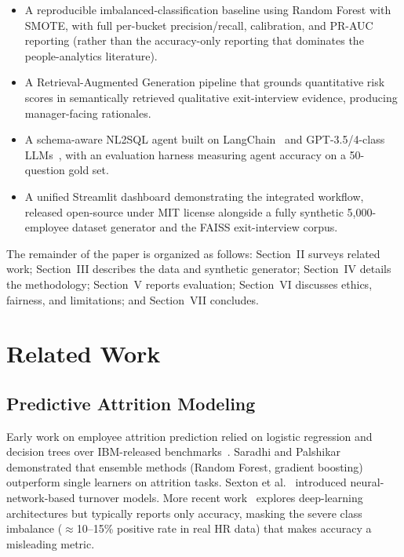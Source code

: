 \documentclass[conference]{IEEEtran}
\begin{document}
\begin{itemize}
\item A reproducible imbalanced-classification baseline using Random
Forest with SMOTE, with full per-bucket precision/recall, calibration,
and PR-AUC reporting (rather than the accuracy-only reporting that
dominates the people-analytics literature).
\item A Retrieval-Augmented Generation pipeline that grounds
quantitative risk scores in semantically retrieved qualitative
exit-interview evidence, producing manager-facing rationales.
\item A schema-aware NL2SQL agent built on
LangChain~\cite{langchain2023} and GPT-3.5/4-class
LLMs~\cite{brown2020}, with an evaluation harness measuring agent
accuracy on a 50-question gold set.
\item A unified Streamlit dashboard demonstrating the integrated
workflow, released open-source under MIT license alongside a
fully synthetic 5{,}000-employee dataset generator and the FAISS
exit-interview corpus.
\end{itemize}

The remainder of the paper is organized as follows: Section~II surveys
related work; Section~III describes the data and synthetic generator;
Section~IV details the methodology; Section~V reports evaluation;
Section~VI discusses ethics, fairness, and limitations; and
Section~VII concludes.

\section{Related Work}

\subsection{Predictive Attrition Modeling}
Early work on employee attrition prediction relied on logistic
regression and decision trees over IBM-released
benchmarks~\cite{ibm2017}. Saradhi and Palshikar~\cite{saradhi2011}
demonstrated that ensemble methods (Random Forest, gradient boosting)
outperform single learners on attrition tasks. Sexton et
al.~\cite{sexton2005} introduced neural-network-based turnover models.
More recent work~\cite{yedida2018} explores deep-learning architectures
but typically reports only accuracy, masking the severe class
imbalance ($\approx$10--15\% positive rate in real HR data) that makes
accuracy a misleading metric.
\end{document}
